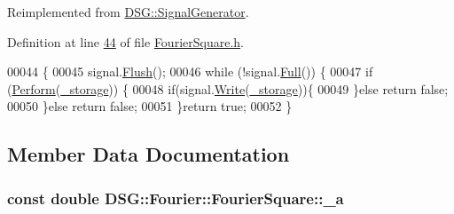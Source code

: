 Reimplemented from \hyperlink{class_d_s_g_1_1_signal_generator_ab050f80e84e6c8b3e354b56930d6a02b}{D\+S\+G\+::\+Signal\+Generator}.



Definition at line \hyperlink{_fourier_square_8h_source_l00044}{44} of file \hyperlink{_fourier_square_8h_source}{Fourier\+Square.\+h}.


\begin{DoxyCode}
00044                                                                          \{
00045             signal.\hyperlink{class_d_s_g_1_1_ring_buffer_ab23c8003d2857809a816068eeb209d60}{Flush}();
00046             \textcolor{keywordflow}{while} (!signal.\hyperlink{class_d_s_g_1_1_ring_buffer_a53ddb04ffcbb5470a8d2b0a3c65b70cb}{Full}()) \{
00047                 \textcolor{keywordflow}{if} (\hyperlink{class_d_s_g_1_1_fourier_1_1_fourier_square_a05bd0cd3e76ca22e1cede5afb47fbbc4}{Perform}(\hyperlink{class_d_s_g_1_1_signal_generator_a28a9b47a1aa0783029f11a19ba0363f2}{\_storage})) \{
00048                     \textcolor{keywordflow}{if}(signal.\hyperlink{class_d_s_g_1_1_ring_buffer_aa5dd2caa0a270173251faee40a43d692}{Write}(\hyperlink{class_d_s_g_1_1_signal_generator_a28a9b47a1aa0783029f11a19ba0363f2}{\_storage}))\{
00049                     \}\textcolor{keywordflow}{else} \textcolor{keywordflow}{return} \textcolor{keyword}{false};
00050                 \}\textcolor{keywordflow}{else} \textcolor{keywordflow}{return} \textcolor{keyword}{false};
00051             \}\textcolor{keywordflow}{return} \textcolor{keyword}{true};
00052         \}
\end{DoxyCode}


\subsection{Member Data Documentation}
\hypertarget{class_d_s_g_1_1_fourier_1_1_fourier_square_a974287b077bd7bff2b028dd1af75e3d0}{
\subsubsection[{\+\_\+a}]{\setlength{\rightskip}{0pt plus 5cm}const double D\+S\+G\+::\+Fourier\+::\+Fourier\+Square\+::\+\_\+a\hspace{0.3cm}{\ttfamily [protected]}}}\label{class_d_s_g_1_1_fourier_1_1_fourier_square_a974287b077bd7bff2b028dd1af75e3d0}


